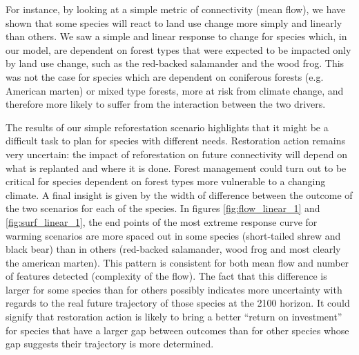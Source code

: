 For instance, by looking at a simple metric of connectivity (mean flow), we have shown that some species will react to land use change more simply and linearly than others. We saw a simple and linear response to change for species which, in our model, are dependent on forest types that were expected to be impacted only by land use change, such as the red-backed salamander and the wood frog. This was not the case for species which are dependent on coniferous forests (e.g. American marten) or mixed type forests, more at risk from climate change, and therefore more likely to suffer from the interaction between the two drivers. 

The results of our simple reforestation scenario highlights that it might be a difficult task to plan for species with different needs. Restoration action remains very uncertain: the impact of reforestation on future connectivity will depend on what is replanted and where it is done. Forest management could turn out to be critical for species dependent on forest types more vulnerable to a changing climate. A final insight is given by the width of difference between the outcome of the two scenarios for each of the species. In figures \ref{fig:flow_linear_1} and \ref{fig:surf_linear_1},  the end points of the most extreme response curve for warming scenarios are more spaced out in some species (short-tailed shrew and black bear) than in others (red-backed salamander, wood frog and most clearly the american marten). This pattern is consistent for both mean flow and number of features detected (complexity of the flow). The fact that this difference is larger for some species  than for others possibly indicates more uncertainty with regards to the real future trajectory of those species at the 2100 horizon. It could signify that restoration action is likely to bring a better “return on investment” for species that have a larger gap between outcomes than for other species whose gap suggests their trajectory is more determined.   

